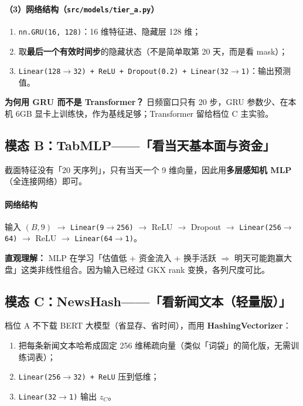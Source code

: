 \documentclass[UTF8,a4paper,12pt]{ctexart}
\begin{document}
\paragraph{（3）网络结构（\texttt{src/models/tier\_a.py}）}

\begin{enumerate}[leftmargin=2em]
  \item \texttt{nn.GRU(16, 128)}：16 维特征进、隐藏层 128 维；
  \item 取\textbf{最后一个有效时间步}的隐藏状态（不是简单取第 20 天，而是看 mask）；
  \item \texttt{Linear(128$\to$32) + ReLU + Dropout(0.2) + Linear(32$\to$1)}：输出预测值。
\end{enumerate}

\textbf{为何用 GRU 而不是 Transformer？} 日频窗口只有 20 步，GRU 参数少、在本机 6GB 显卡上训练快，作为基线足够；Transformer 留给档位 C 主实验。

\subsection{模态 B：TabMLP——「看当天基本面与资金」}

截面特征没有「20 天序列」，只有当天一个 9 维向量，因此用\textbf{多层感知机 MLP}（全连接网络）即可。

\paragraph{网络结构}

输入 $(B, 9)$ $\to$ \texttt{Linear(9$\to$256)} $\to$ ReLU $\to$ Dropout $\to$ \texttt{Linear(256$\to$64)} $\to$ ReLU $\to$ \texttt{Linear(64$\to$1)}。

\textbf{直观理解：} MLP 在学习「估值低 + 资金流入 + 换手活跃 $\Rightarrow$ 明天可能跑赢大盘」这类非线性组合。因为输入已经过 GKX rank 变换，各列尺度可比。

\subsection{模态 C：NewsHash——「看新闻文本（轻量版）」}

档位 A 不下载 BERT 大模型（省显存、省时间），而用 \textbf{HashingVectorizer}：

\begin{enumerate}[leftmargin=2em]
  \item 把每条新闻文本哈希成固定 256 维稀疏向量（类似「词袋」的简化版，无需训练词表）；
  \item \texttt{Linear(256$\to$32) + ReLU} 压到低维；
  \item \texttt{Linear(32$\to$1)} 输出 $z_C$。
\end{enumerate}
\end{document}
